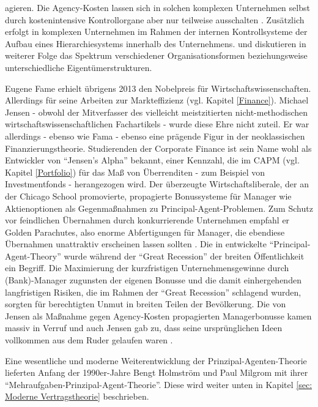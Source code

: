 agieren. Die Agency-Kosten lassen sich in solchen komplexen Unternehmen selbst durch kostenintensive Kontrollorgane aber nur teilweise ausschalten \parencite[S. 311]{Fama1983a}. Zusätzlich erfolgt in komplexen Unternehmen im Rahmen der internen Kontrollsysteme der Aufbau eines Hierarchiesystems innerhalb des Unternehmens. \textcite[S. 313ff]{Fama1983a} und \textcite{Fama1983b} diskutieren in weiterer Folge das Spektrum verschiedener Organisationsformen beziehungsweise unterschiedliche Eigentümerstrukturen.

Eugene Fame erhielt übrigens 2013 den Nobelpreis für Wirtschaftswissenschaften. Allerdings für seine Arbeiten zur Markteffizienz (vgl. Kapitel \ref{Finance}). Michael Jensen - obwohl der Mitverfasser des vielleicht meistzitierten nicht-methodischen wirtschaftswissenschaftlichen Fachartikels - wurde diese Ehre nicht zuteil. Er war allerdings - ebenso wie Fama - ebenso eine prägende Figur in der neoklassischen Finanzierungstheorie. Studierenden der Corporate Finance ist sein Name wohl als Entwickler von "`Jensen's Alpha"' bekannt, einer Kennzahl, die im CAPM (vgl. Kapitel \ref{Portfolio}) für das Maß von Überrenditen - zum Beispiel von Investmentfonds - herangezogen wird. Der überzeugte Wirtschaftsliberale, der an der Chicago School promovierte, propagierte Bonussysteme für Manager wie Aktienoptionen als Gegenmaßnahmen zu Principal-Agent-Problemen. Zum Schutz vor feindlichen Übernahmen durch konkurrierende Unternehmen empfahl er Golden Parachutes, also enorme Abfertigungen für Manager, die ebendiese Übernahmen unattraktiv erscheinen lassen sollten \parencite{Rosenwald2024}. Die in \textcite{Jensen1976} entwickelte "`Principal-Agent-Theory"' wurde während der "`Great Recession"' der breiten Öffentlichkeit ein Begriff. Die Maximierung der kurzfristigen Unternehmensgewinne durch (Bank)-Manager zugunsten der eigenen Bonusse und die damit einhergehenden langfristigen Risiken, die im Rahmen der "`Great Recession"' schlagend wurden, sorgten für berechtigten Unmut in breiten Teilen der Bevölkerung. Die von Jensen als Maßnahme gegen Agency-Kosten propagierten Managerbonusse kamen massiv in Verruf und auch Jensen gab zu, dass seine ursprünglichen Ideen vollkommen aus dem Ruder gelaufen waren \parencite{Jensen2010}.

Eine wesentliche und moderne Weiterentwicklung der Prinzipal-Agenten-Theorie lieferten Anfang der 1990er-Jahre Bengt Holmström und Paul Milgrom mit ihrer "`Mehraufgaben-Prinzipal-Agent-Theorie"'. Diese wird weiter unten in Kapitel \ref{sec: Moderne Vertragstheorie} beschrieben.

